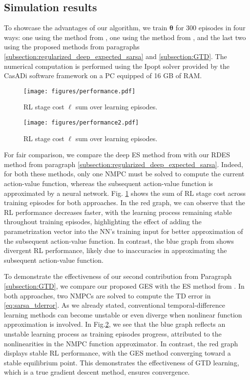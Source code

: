 \documentclass[letterpaper, 10pt, conference]{ieeeconf}
\begin{document}
	\subsection{Simulation results}

To showcase the advantages of our algorithm, we train $\boldsymbol{\theta}$ for 300 episodes in four ways: 
one using the method from \cite{moradimaryamnegari2022model}, one using the method from \cite{moradimaryamnegari2023data}, and the last two using the proposed methods from paragraphs \ref{subsection:regularized_deep_expected_sarsa} and  \ref{subsection:GTD}. 
The numerical computation is performed using the Ipopt solver provided by the CasADi software framework \cite{Andersson2019} on a PC equipped of 16 GB of RAM.       

\begin{figure}[!tb]
	\centering
	\texttt{[image: figures/performance.pdf]}
	\caption{RL stage cost $\ell$ sum over learning episodes.}
	\label{fig:performance1}
\end{figure}
\begin{figure}[!tb]
	\centering
	\texttt{[image: figures/performance2.pdf]}
	\caption{RL stage cost $\ell$ sum over learning episodes.}
	\label{fig:performance2}
\end{figure}

For fair comparison, we compare the deep ES method from \cite{moradimaryamnegari2023data} with our RDES method from paragraph \ref{subsection:regularized_deep_expected_sarsa}.
Indeed, for both these methods, only one NMPC must be solved to compute the current action-value function, whereas the subsequent action-value function is approximated by a neural network.
Fig. \ref{fig:performance1} shows the sum of RL stage cost across training episodes for both approaches. 
In the red graph, we can observe that the RL performance decreases faster, with the learning process remaining stable throughout training episodes, highlighting the effect of adding the parametrization vector into the NN's training input for better approximation of the subsequent action-value function.
In contrast, the blue graph from \cite{moradimaryamnegari2023data} shows divergent RL performance, likely due to inaccuracies in approximating the subsequent action-value function.
 
To demonstrate the effectiveness of our second contribution from Paragraph \ref{subsection:GTD}, we compare our proposed GES with the ES method from \cite{moradimaryamnegari2022model}.
In both approaches, two NMPCs are solved to compute the TD error in \eqref{eq:sarsa_tderror}. 
As we already stated, conventional temporal-difference learning methods can become unstable or even diverge when nonlinear function approximation is involved. 
In Fig.\ref{fig:performance2}, we see that the blue graph reflects an unstable learning process as training episodes progress, attributed to the nonlinearities in the NMPC function approximator.
In contrast, the red graph displays stable RL performance, with the GES method converging toward a stable equilibrium point. 
This demonstrates the effectiveness of GTD learning, which is a true gradient descent method, ensures convergence.
\end{document}
